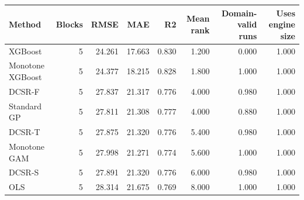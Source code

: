 \begin{tabular}{lrrrrrrr}
\toprule
Method & Blocks & RMSE & MAE & R2 & Mean rank & Domain-valid runs & Uses engine size \\
\midrule
XGBoost & 5 & 24.261 & 17.663 & 0.830 & 1.200 & 0.000 & 1.000 \\
Monotone XGBoost & 5 & 24.377 & 18.215 & 0.828 & 1.800 & 1.000 & 1.000 \\
DCSR-F & 5 & 27.837 & 21.317 & 0.776 & 4.000 & 0.980 & 1.000 \\
Standard GP & 5 & 27.811 & 21.308 & 0.777 & 4.000 & 0.880 & 1.000 \\
DCSR-T & 5 & 27.875 & 21.320 & 0.776 & 5.400 & 0.980 & 1.000 \\
Monotone GAM & 5 & 27.998 & 21.271 & 0.774 & 5.600 & 1.000 & 1.000 \\
DCSR-S & 5 & 27.891 & 21.320 & 0.776 & 6.000 & 0.980 & 1.000 \\
OLS & 5 & 28.314 & 21.675 & 0.769 & 8.000 & 1.000 & 1.000 \\
\bottomrule
\end{tabular}
